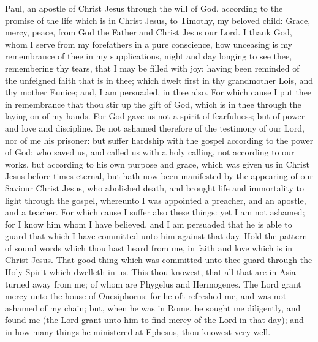 


Paul, an apostle of Christ Jesus through the will of God, according to the promise of the life which is in Christ Jesus, to Timothy, my beloved child: Grace, mercy, peace, from God the Father and Christ Jesus our Lord.  I thank God, whom I serve from my forefathers in a pure conscience, how unceasing is my remembrance of thee in my supplications, night and day longing to see thee, remembering thy tears, that I may be filled with joy; having been reminded of the unfeigned faith that is in thee; which dwelt first in thy grandmother Lois, and thy mother Eunice; and, I am persuaded, in thee also. For which cause I put thee in remembrance that thou stir up the gift of God, which is in thee through the laying on of my hands. For God gave us not a spirit of fearfulness; but of power and love and discipline. Be not ashamed therefore of the testimony of our Lord, nor of me his prisoner: but suffer hardship with the gospel according to the power of God; who saved us, and called us with a holy calling, not according to our works, but according to his own purpose and grace, which was given us in Christ Jesus before times eternal, but hath now been manifested by the appearing of our Saviour Christ Jesus, who abolished death, and brought life and immortality to light through the gospel, whereunto I was appointed a preacher, and an apostle, and a teacher. For which cause I suffer also these things: yet I am not ashamed; for I know him whom I have believed, and I am persuaded that he is able to guard that which I have committed unto him against that day. Hold the pattern of sound words which thou hast heard from me, in faith and love which is in Christ Jesus. That good thing which was committed unto thee guard through the Holy Spirit which dwelleth in us.  This thou knowest, that all that are in Asia turned away from me; of whom are Phygelus and Hermogenes. The Lord grant mercy unto the house of Onesiphorus: for he oft refreshed me, and was not ashamed of my chain; but, when he was in Rome, he sought me diligently, and found me (the Lord grant unto him to find mercy of the Lord in that day); and in how many things he ministered at Ephesus, thou knowest very well. 

